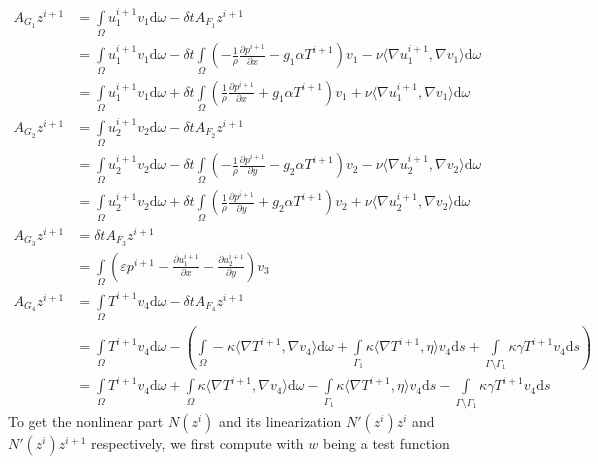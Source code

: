 \documentclass{article}
\begin{document}
\begin{align*}
A_{G_1}z^{i+1} &= \int\limits_\Omega u_1^{i+1} v_1 \text{d}\omega - \delta tA_{F_1}z^{i+1} \\
&= \int\limits_\Omega u_1^{i+1} v_1 \text{d}\omega - \delta t\int\limits_\Omega \left(-\frac{1}{\rho}\frac{\partial p^{i+1}}{\partial x}-g_1\alpha T^{i+1}\right)v_1 - \nu\langle \nabla u_1^{i+1},\nabla v_1\rangle \text{d}\omega\\
&= \int\limits_\Omega u_1^{i+1} v_1 \text{d}\omega + \delta t\int\limits_\Omega \left(\frac{1}{\rho}\frac{\partial p^{i+1}}{\partial x}+g_1\alpha T^{i+1}\right)v_1 + \nu\langle \nabla u_1^{i+1},\nabla v_1\rangle \text{d}\omega\\
A_{G_2}z^{i+1} &= \int\limits_\Omega u_2^{i+1} v_2 \text{d}\omega - \delta tA_{F_2}z^{i+1} \\
&= \int\limits_\Omega u_2^{i+1} v_2 \text{d}\omega - \delta t\int\limits_\Omega \left(-\frac{1}{\rho}\frac{\partial p^{i+1}}{\partial y}-g_2\alpha T^{i+1}\right)v_2 - \nu\langle \nabla u_2^{i+1},\nabla v_2\rangle \text{d}\omega\\
&= \int\limits_\Omega u_2^{i+1} v_2 \text{d}\omega + \delta t\int\limits_\Omega \left(\frac{1}{\rho}\frac{\partial p^{i+1}}{\partial y}+g_2\alpha T^{i+1}\right)v_2 + \nu\langle \nabla u_2^{i+1},\nabla v_2\rangle \text{d}\omega\\
A_{G_3}z^{i+1} &= \delta tA_{F_3} z^{i+1} \\
&= \int\limits_\Omega (\varepsilon p^{i+1} - \frac{\partial u_1^{i+1}}{\partial x} - \frac{\partial u_2^{i+1}}{\partial y})v_3\\
A_{G_4}z^{i+1} &= \int\limits_\Omega T^{i+1} v_4 \text{d}\omega - \delta tA_{F_4}z^{i+1} \\
&= \int\limits_\Omega T^{i+1} v_4 \text{d}\omega -\left(\int\limits_\Omega -\kappa \langle \nabla T^{i+1},\nabla v_4\rangle \text{d}\omega + \int\limits_{\Gamma_1} \kappa\langle \nabla T^{i+1},\eta\rangle v_4 \text{d}s + \int\limits_{\Gamma \setminus \Gamma_1}\kappa\gamma T^{i+1}v_4\text{d}s\right) \\
&= \int\limits_\Omega T^{i+1} v_4 \text{d}\omega + \int\limits_\Omega \kappa \langle \nabla T^{i+1},\nabla v_4\rangle \text{d}\omega - \int\limits_{\Gamma_1} \kappa\langle \nabla T^{i+1},\eta\rangle v_4 \text{d}s - \int\limits_{\Gamma \setminus \Gamma_1}\kappa\gamma T^{i+1}v_4\text{d}s
\end{align*}
To get the nonlinear part $N(z^i)$ and its linearization $N'(z^i)z^i$ and $N'(z^i)z^{i+1}$ respectively, we first compute with $w$ being a test function
\end{document}

